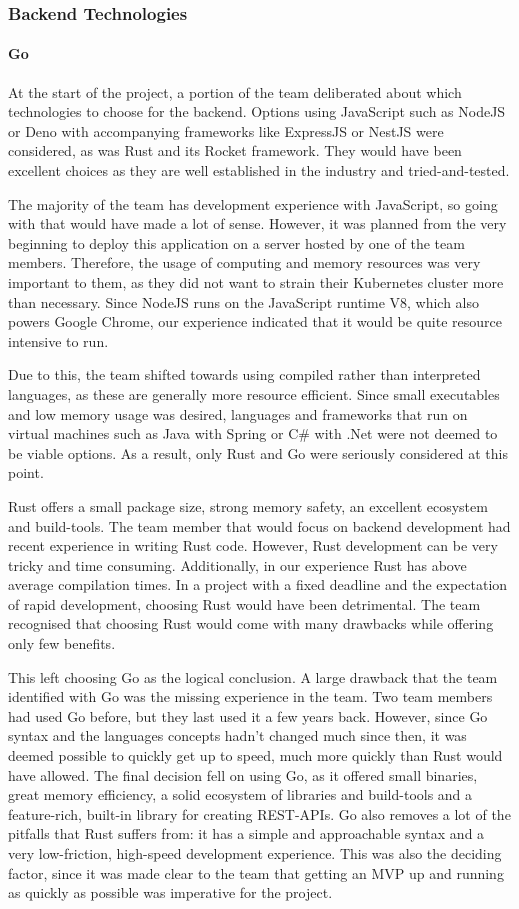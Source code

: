 \subsubsection{Backend Technologies}
\paragraph{Go}
At the start of the project, a portion of the team deliberated about which
technologies to choose for the backend. Options using JavaScript such as NodeJS
or Deno with accompanying frameworks like ExpressJS or NestJS were considered,
as was Rust and its Rocket framework. They would have been excellent choices as
they are well established in the industry and tried-and-tested.

The majority of the team has development experience with JavaScript, so going
with that would have made a lot of sense. However, it was planned from the very
beginning to deploy this application on a server hosted by one of the team
members. Therefore, the usage of computing and memory resources was very
important to them, as they did not want to strain their Kubernetes cluster more
than necessary. Since NodeJS runs on the JavaScript runtime V8, which also
powers Google Chrome, our experience indicated that it would be quite resource
intensive to run.

Due to this, the team shifted towards using compiled rather than interpreted
languages, as these are generally more resource efficient. Since small
executables and low memory usage was desired, languages and frameworks that run
on virtual machines such as Java with Spring or C\# with .Net were not deemed to
be viable options. As a result, only Rust and Go were seriously considered at
this point.

Rust offers a small package size, strong memory safety, an excellent
ecosystem and build-tools. The team member that would focus on backend
development had recent experience in writing Rust code. However, Rust
development can be very tricky and time consuming. Additionally, in our
experience Rust has above average compilation times. In a project with a fixed
deadline and the expectation of rapid development, choosing Rust would have been
detrimental. The team recognised that choosing Rust would come with many
drawbacks while offering only few benefits.

This left choosing Go as the logical conclusion. A large drawback that the team
identified with Go was the missing experience in the team. Two team members had
used Go before, but they last used it a few years back. However, since Go syntax
and the languages concepts hadn't changed much since then, it was deemed
possible to quickly get up to speed, much more quickly than Rust would have
allowed. The final decision fell on using Go, as it offered small binaries,
great memory efficiency, a solid ecosystem of libraries and build-tools and a
feature-rich, built-in library for creating REST-APIs. Go also removes a lot of
the pitfalls that Rust suffers from: it has a simple and approachable syntax and
a very low-friction, high-speed development experience. This was also the
deciding factor, since it was made clear to the team that getting an MVP up and
running as quickly as possible was imperative for the project.
